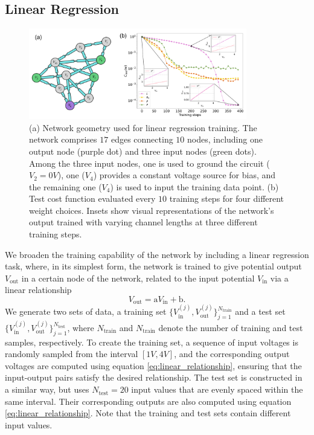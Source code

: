 \documentclass[reprint,superscriptaddress,prb,showkeys]{revtex4-2}
\begin{document}
\subsection{\label{sec:linear_regression}Linear Regression}
\begin{figure}[t]
    \centering
    \includegraphics[width=0.85\textwidth]{plots/regression/regression_G00010001.pdf}
    \caption{(a) Network geometry used for linear regression training. The network comprises $17$ edges connecting $10$ nodes, including one output node (purple dot) and three input nodes (green dots). Among the three input nodes, one is used to ground the circuit ($V_2 = 0V$), one ($V_4$) provides a constant voltage source for bias, and the remaining one ($V_4$) is used to input the training data point. (b) Test cost function evaluated every $10$ training steps for four different weight choices. Insets show visual representations of the network’s output trained with varying channel lengths at three different training steps.}\label{fig:lin_regr1}
\end{figure}

We broaden the training capability of the network by including a linear regression task, where, in its simplest form, the network is trained to give potential output $V_{\text{out}}$ in a certain node of the network, related to the input potential $V_{\text{in}}$ via a linear relationship
\begin{equation}
    V_{\text{out}} = \text{a} V_{\text{in}} + \text{b}.
\label{eq:linear_relationship}
\end{equation}
We generate two sets of data, a training set $ \{ V_{\text{in}}^{(j)}, V_{\text{out}}^{(j)} \}_{j=1}^{N_{\text{train}}}$ and a test set $ \{ V_{\text{in}}^{(j)}, V_{\text{out}}^{(j)} \}_{j=1}^{N_{\text{test}}}$, where $N_{\text{train}}$ and $N_{\text{train}}$ denote the number of training and test samples, respectively. To create the training set, a sequence of input voltages is randomly sampled from the interval $[1V, 4V]$, and the corresponding output voltages are computed using equation \cref{eq:linear_relationship}, ensuring that the input-output pairs satisfy the desired relationship.
The test set is constructed in a similar way, but uses $N_{\text{test}}=20$ input values that are evenly spaced within the same interval. Their corresponding outputs are also computed using equation \cref{eq:linear_relationship}. Note that the training and test sets contain different input values.
\end{document}
